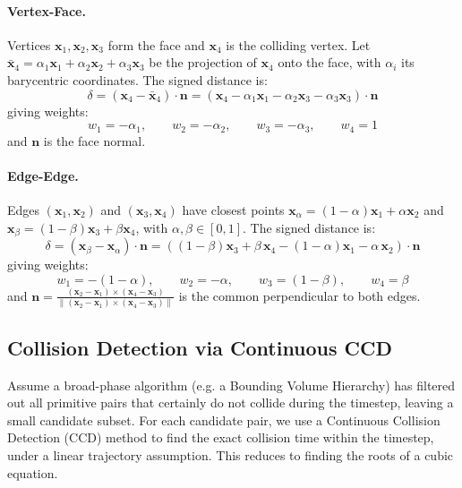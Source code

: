 \documentclass{article}
\begin{document}
\paragraph{Vertex-Face.}
Vertices $\mathbf{x}_1, \mathbf{x}_2, \mathbf{x}_3$ form the face and $\mathbf{x}_4$ is the colliding vertex. Let $\bar{\mathbf{x}}_4 = \alpha_1\mathbf{x}_1 + \alpha_2\mathbf{x}_2 + \alpha_3\mathbf{x}_3$ be the projection of $\mathbf{x}_4$ onto the face, with $\alpha_i$ its barycentric coordinates. The signed distance is:
\begin{equation*}
\delta = 
    (\mathbf{x}_4 - \bar{\mathbf{x}}_4)\cdot \mathbf{n} =
    (\mathbf{x}_4 - \alpha_1\mathbf{x}_1 - \alpha_2\mathbf{x}_3 - \alpha_3\mathbf{x}_3)\cdot \mathbf{n}
\end{equation*}
giving weights:
\begin{equation*}
    w_1 = -\alpha_1, \qquad w_2 = -\alpha_2, \qquad w_3 = -\alpha_3, \qquad w_4 = 1
\end{equation*}
and $\mathbf{n}$ is the face normal.

\paragraph{Edge-Edge.}
Edges $(\mathbf{x}_1, \mathbf{x}_2)$ and $(\mathbf{x}_3, \mathbf{x}_4)$ have closest points $\mathbf{x}_\alpha = (1-\alpha)\mathbf{x}_1 + \alpha\mathbf{x}_2$ and $\mathbf{x}_\beta = (1-\beta)\mathbf{x}_3 + \beta\mathbf{x}_4$, with $\alpha, \beta \in [0,1]$. The signed distance is:
\begin{equation*}
\delta = 
    (\mathbf{x}_{\beta} - \mathbf{x}_{\alpha})\cdot \mathbf{n} =
    ((1 - \beta)\mathbf{x}_3 + \beta\,\mathbf{x}_4 - (1 - \alpha)\mathbf{x}_1 - \alpha\,\mathbf{x}_2)\cdot \mathbf{n}
\end{equation*}
giving weights:
\begin{equation*}
    w_1 = -(1-\alpha), \qquad w_2 = -\alpha, \qquad w_3 = (1-\beta), \qquad w_4 = \beta
\end{equation*}
and $\mathbf{n} = \frac{(\mathbf{x}_2 - \mathbf{x}_1)\times(\mathbf{x}_4 - \mathbf{x}_3)}{\|(\mathbf{x}_2 - \mathbf{x}_1)\times(\mathbf{x}_4 - \mathbf{x}_3)\|}$ is the common perpendicular to both edges.

\subsection{Collision Detection via Continuous CCD}
Assume a broad-phase algorithm (e.g. a Bounding Volume Hierarchy) has filtered out all primitive pairs that certainly do not collide during the timestep, leaving a small candidate subset. For each candidate pair, we use a Continuous Collision Detection (CCD) method to find the exact collision time within the timestep, under a linear trajectory assumption. This reduces to finding the roots of a cubic equation.
\end{document}
